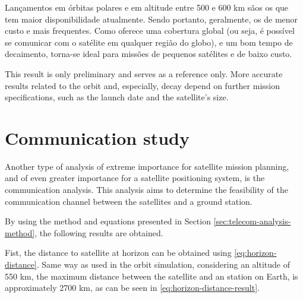 Lançamentos em órbitas polares e em altitude entre 500 e 600 km sãos os que tem maior disponibilidade atualmente. Sendo portanto, geralmente, os de menor custo e mais frequentes. Como oferece uma cobertura global (ou seja, é possível se comunicar com o satélite em qualquer região do globo), e um bom tempo de decaimento, torna-se ideal para missões de pequenos satélites e de baixo custo.


This result is only preliminary and serves as a reference only. More accurate results related to the orbit and, especially, decay depend on further mission specifications, such as the launch date and the satellite's size.

\section{Communication study}



Another type of analysis of extreme importance for satellite mission planning, and of even greater importance for a satellite positioning system, is the communication analysis. This analysis aims to determine the feasibility of the communication channel between the satellites and a ground station.

By using the method and equations presented in Section \ref{sec:telecom-analysis-method}, the following results are obtained.

Fist, the distance to satellite at horizon can be obtained using \autoref{eq:horizon-distance}. Same way as used in the orbit simulation, considering an altitude of 550 km, the maximum distance between the satellite and an station on Earth, is approximately 2700 km, as can be seen in \autoref{eq:horizon-distance-result}.

